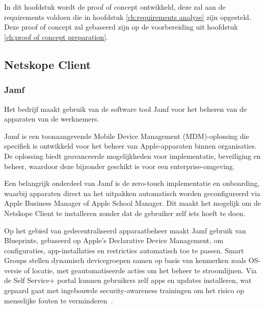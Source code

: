 
\chapter{}%
\label{ch:proof of concept implementation}

In dit hoofdstuk wordt de proof of concept ontwikkeld, deze zal aan de requirements voldoen die in hoofdstuk \ref{ch:requirements analyse} zijn opgesteld. Deze proof of concept zal gebaseerd zijn op de voorbereiding uit hoofdstuk \ref{ch:proof of concept preparation}.

\section{Netskope Client}

\subsection{Jamf}
Het bedrijf maakt gebruik van de software tool Jamf voor het beheren van de apparaten van de werknemers.

Jamf is een toonaangevende Mobile Device Management (MDM)-oplossing die specifiek is ontwikkeld voor het beheer van Apple-apparaten binnen organisaties. De oplossing biedt geavanceerde mogelijkheden voor implementatie, beveiliging en beheer, waardoor deze bijzonder geschikt is voor een enterprise-omgeving.  

Een belangrijk onderdeel van Jamf is de zero-touch implementatie en onboarding, waarbij apparaten direct na het uitpakken automatisch worden geconfigureerd via Apple Business Manager of Apple School Manager.  Dit maakt het mogelijk om de Netskope Client te installeren zonder dat de gebruiker zelf iets hoeft te doen.

Op het gebied van gedecentraliseerd apparaatbeheer maakt Jamf gebruik van Blueprints, gebaseerd op Apple’s Declarative Device Management, om configuraties, app-installaties en restricties automatisch toe te passen. Smart Groups stellen dynamisch devicegroepen samen op basis van kenmerken zoals OS-versie of locatie, met geautomatiseerde acties om het beheer te stroomlijnen. Via de Self Service+ portal kunnen gebruikers zelf apps en updates installeren, wat gepaard gaat met ingebouwde security-awareness trainingen om het risico op menselijke fouten te verminderen~\autocite{Jamf2025}.

